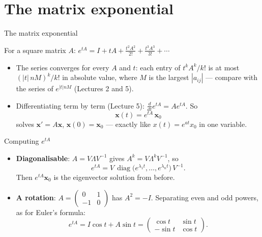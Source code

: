 \documentclass[10pt]{wosm-slides}
\newcommand{\vx}{\mathbf{x}}
\begin{document}
\section{The matrix exponential}

\begin{frame}{The matrix exponential}
  \begin{definition}
    For a square matrix $A$: \quad $\displaystyle e^{tA} = I + tA + \frac{t^2 A^2}{2!} + \frac{t^3 A^3}{3!} + \cdots$
  \end{definition}
  \pause
  \begin{itemize}
    \item The series converges for every $A$ and $t$: each entry of $t^k A^k / k!$ is at most
      $(|t|\, n M)^k / k!$ in absolute value, where $M$ is the largest $|a_{ij}|$ --- compare with the
      series of $e^{|t| n M}$ (Lectures 2 and 5).
    \pause
    \item Differentiating term by term (Lecture 5): $\frac{d}{dt} e^{tA} = A e^{tA}$. So
      \[ \vx(t) = e^{tA}\, \vx_0 \]
      solves $\vx' = A\vx$, $\vx(0) = \vx_0$ --- exactly like $x(t) = e^{at} x_0$ in one variable.
  \end{itemize}
\end{frame}

\begin{frame}{Computing $e^{tA}$}
  \begin{itemize}
    \item \textbf{Diagonalisable}: $A = V\Lambda V^{-1}$ gives $A^k = V\Lambda^k V^{-1}$, so
      \[ e^{tA} = V\, \operatorname{diag}\bigl(e^{\lambda_1 t}, \dots, e^{\lambda_n t}\bigr)\, V^{-1} . \]
      Then $e^{tA}\vx_0$ is the eigenvector solution from before.
    \pause
    \item \textbf{A rotation}: $A = \begin{pmatrix} 0 & 1 \\ -1 & 0 \end{pmatrix}$ has $A^2 = -I$. Separating even and
      odd powers, as for Euler's formula:
      \[ e^{tA} = I\cos t + A \sin t = \begin{pmatrix} \cos t & \sin t \\ -\sin t & \cos t \end{pmatrix} . \]
  \end{itemize}
\end{frame}
\end{document}
